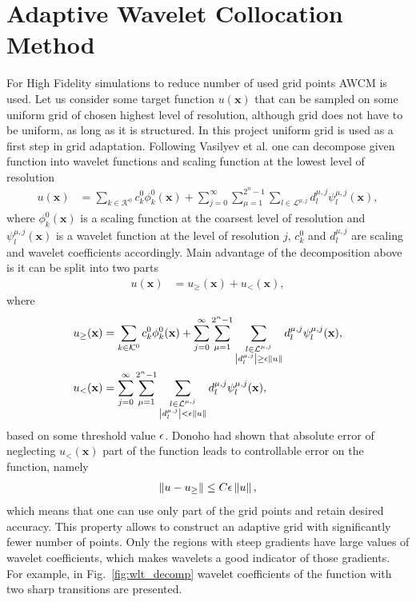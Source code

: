 \section{Adaptive Wavelet Collocation Method}
For High Fidelity simulations to reduce number of used grid points AWCM is used. Let us consider some target function $u(\mathbf x)$ that can be sampled on some uniform grid of chosen highest level of resolution, although grid does not have to be uniform, as long as it is structured. In this project uniform grid is used as a first step in grid adaptation. Following Vasilyev et al. \cite{lib:wlt_main} one can decompose given function into wavelet functions and scaling function at the lowest level of resolution
\begin{align}
u(\mathbf x) &= \sum_{k \in \mathcal K^0} c_k^0 \phi_k^0 (\mathbf x) + \sum_{j = 0}^\infty \sum_{\mu = 1}^{2^n - 1} \sum_{l \in \mathcal L^{\mu, j}} d_l^{\mu, j} \psi_l^{\mu, j} (\mathbf x),
\end{align}
where $\phi_k^0(\mathbf x)$ is a scaling function at the coarsest level of resolution and $\psi_l^{\mu, j}(\mathbf x)$ is a wavelet function at the level of resolution $j$, $c_k^0$ and $d_l^{\mu, j}$ are scaling and wavelet coefficients accordingly. Main advantage of the decomposition above is it can be split into two parts
\begin{align}
u(\mathbf x) &= u_\ge (\mathbf x) + u_< (\mathbf x),
\end{align}
where
\begin{align}
\nonumber
u_\ge (\mathbf x) &= \sum_{k \in \mathcal K^0} c_k^0 \phi_k^0 (\mathbf x) + \sum_{j = 0}^\infty \sum_{\mu = 1}^{2^n - 1} \sum_{\substack{l \in \mathcal L^{\mu, j} \\ \left|d_l^{\mu, j}\right| \ge \epsilon \left\|u\right\| }} d_l^{\mu, j} \psi_l^{\mu, j} (\mathbf x), \\
u_<(\mathbf x) &= \sum_{j = 0}^\infty \sum_{\mu = 1}^{2^n - 1} \sum_{\substack{l \in \mathcal L^{\mu, j} \\ \left|d_l^{\mu, j}\right| < \epsilon \left\|u\right\| }} d_l^{\mu, j} \psi_l^{\mu, j} (\mathbf x),
\end{align}
based on some threshold value $\epsilon$. Donoho \cite{lib:donoho} had shown that absolute error of neglecting $u_<(\mathbf x)$ part of the function leads to controllable error on the function, namely
\begin{align}
\left\|u - u_\ge\right\| \le C \epsilon \left\|u\right\|,
\end{align}
which means that one can use only part of the grid points and retain desired accuracy. This property allows to construct an adaptive grid with significantly fewer number of points. Only the regions with steep gradients have large values of wavelet coefficients, which makes wavelets a good indicator of those gradients. For example, in Fig.~\ref{fig:wlt_decomp} wavelet coefficients of the function with two sharp transitions are presented.

